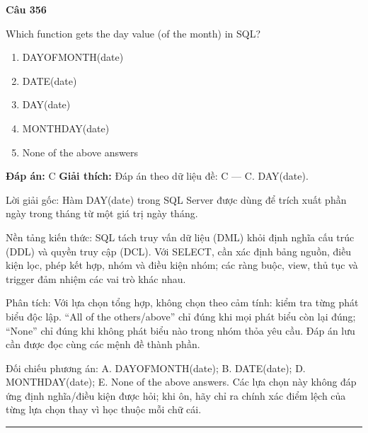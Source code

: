 \documentclass[11pt,a4paper]{article}
\newenvironment{question}[1]{%
  \par\vspace{1em}\noindent\textbf{\large Câu #1}\par\vspace{0.4em}
}{%
  \par\vspace{1em}\hrule\vspace{0.6em}
}
\newenvironment{choices}{%
  \begin{enumerate}[label=\textbf{\Alph*.},leftmargin=2.2em,itemsep=2pt,topsep=3pt]
}{%
  \end{enumerate}
}
\newcommand{\choice}{\item}
\begin{document}
\begin{question}{356}
Which function gets the day value (of the month) in SQL?
\begin{choices}
\choice DAYOFMONTH(date)
\choice DATE(date)
\choice DAY(date)
\choice MONTHDAY(date)
\choice None of the above answers
\end{choices}
\textbf{Đáp án:} C
\textbf{Giải thích:} Đáp án theo dữ liệu đề: C — C. DAY(date).

Lời giải gốc: Hàm DAY(date) trong SQL Server được dùng để trích xuất phần ngày trong tháng từ một giá trị ngày tháng.

Nền tảng kiến thức: SQL tách truy vấn dữ liệu (DML) khỏi định nghĩa cấu trúc (DDL) và quyền truy cập (DCL). Với SELECT, cần xác định bảng nguồn, điều kiện lọc, phép kết hợp, nhóm và điều kiện nhóm; các ràng buộc, view, thủ tục và trigger đảm nhiệm các vai trò khác nhau.

Phân tích: Với lựa chọn tổng hợp, không chọn theo cảm tính: kiểm tra từng phát biểu độc lập. “All of the others/above” chỉ đúng khi mọi phát biểu còn lại đúng; “None” chỉ đúng khi không phát biểu nào trong nhóm thỏa yêu cầu. Đáp án lưu cần được đọc cùng các mệnh đề thành phần.

Đối chiếu phương án: A. DAYOFMONTH(date); B. DATE(date); D. MONTHDAY(date); E. None of the above answers. Các lựa chọn này không đáp ứng định nghĩa/điều kiện được hỏi; khi ôn, hãy chỉ ra chính xác điểm lệch của từng lựa chọn thay vì học thuộc mỗi chữ cái.
\end{question}
\end{document}
